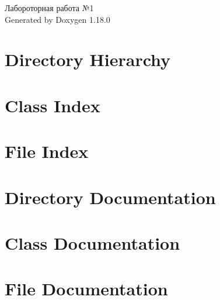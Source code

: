 \documentclass[twoside]{book}
\newcommand{\+}{\discretionary{\mbox{\scriptsize$\hookleftarrow$}}{}{}}
\newcommand{\clearemptydoublepage}{%
    \newpage{\pagestyle{empty}\cleardoublepage}%
  }
\begin{document}
  \raggedbottom
    \hypersetup{pageanchor=false,
                bookmarksnumbered=true,
                pdfencoding=unicode
               }
  \begin{titlepage}
  \vspace*{7cm}
  \begin{center}%
  {\Large Лабороторная работа №1}\\
  \vspace*{1cm}
  {\large Generated by Doxygen 1.18.0}\\
  \end{center}
  \end{titlepage}
  \clearemptydoublepage
  \tableofcontents
  \clearemptydoublepage
  \hypersetup{pageanchor=true}
\chapter{Directory Hierarchy}

\chapter{Class Index}

\chapter{File Index}

\chapter{Directory Documentation}






\chapter{Class Documentation}



\chapter{File Documentation}






  \backmatter
  \newpage
  \clearemptydoublepage
  \printindex
\end{document}
